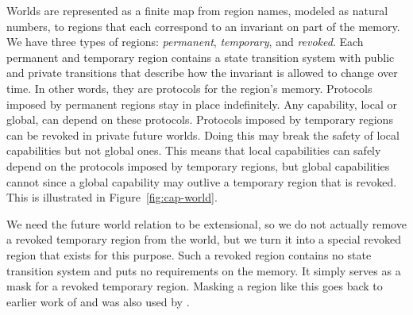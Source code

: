 \documentclass[format=acmsmall, review=true, screen=true]{acmart}
\renewcommand{\figurename}{Figure}
\renewcommand{\sectionname}{Section}
\newcommand\dominique[1]{{\color{purple} \sf \footnotesize {DD: #1}}\\}
\renewcommand\dominique[1]{}
\begin{document}
Worlds are represented as a finite map from region names, modeled as natural numbers, to regions that each correspond to an invariant on part of the memory.
We have three types of regions: \emph{permanent}, \emph{temporary}, and \emph{revoked}.
Each permanent and temporary region contains a state transition system with public and private transitions that describe how the invariant is allowed to change over time.
In other words, they are protocols for the region's memory.
Protocols imposed by permanent regions stay in place indefinitely.
Any capability, local or global, can depend on these protocols.
Protocols imposed by temporary regions can be revoked in private future worlds.
Doing this may break the safety of local capabilities but not global ones.
This means that local capabilities can safely depend on the protocols imposed by temporary regions, but global capabilities cannot since a global capability may outlive a temporary region that is revoked.
This is illustrated in \figurename~\ref{fig:cap-world}.

We need the future world relation to be extensional, so we do not actually remove a revoked temporary region from the world, but we turn it into a special revoked region that exists for this purpose.
Such a revoked region contains no state transition system and puts no requirements on the memory.
It simply serves as a mask for a revoked temporary region.
Masking a region like this goes back to earlier work of \citet{Ahmed2004semantics} and was also used by \citet{Thamsborg:2011:KLR:2034773.2034831}.


\end{document}

